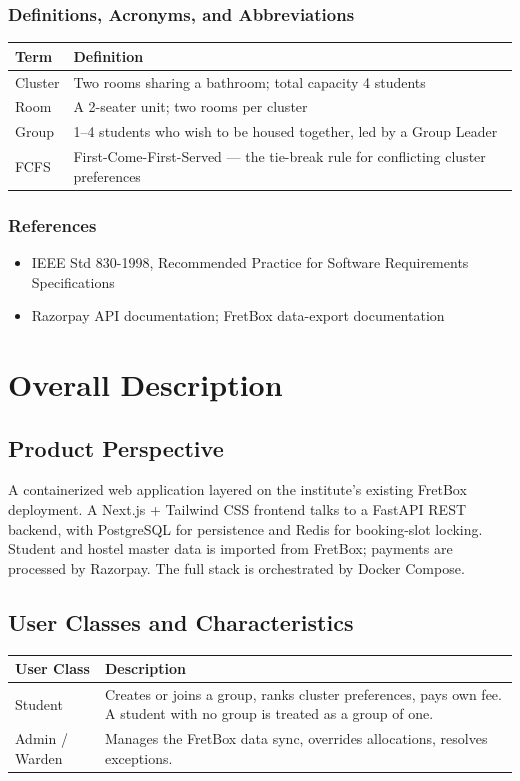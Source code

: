 \documentclass[11pt]{report}
\begin{document}
\subsection*{Definitions, Acronyms, and Abbreviations}
\begin{longtable}{p{3.2cm}p{10cm}}
\toprule
\textbf{Term} & \textbf{Definition} \\
\midrule
Cluster & Two rooms sharing a bathroom; total capacity 4 students \\
Room & A 2-seater unit; two rooms per cluster \\
Group & 1--4 students who wish to be housed together, led by a Group Leader \\
FCFS & First-Come-First-Served --- the tie-break rule for conflicting cluster preferences \\
\bottomrule
\end{longtable}

\subsection*{References}
\begin{itemize}[leftmargin=1.2cm]
    \item IEEE Std 830-1998, Recommended Practice for Software Requirements Specifications
    \item Razorpay API documentation; FretBox data-export documentation
\end{itemize}

\chapter{Overall Description}

\section{Product Perspective}
A containerized web application layered on the institute's existing FretBox deployment. A Next.js +
Tailwind CSS frontend talks to a FastAPI REST backend, with PostgreSQL for persistence and Redis for
booking-slot locking. Student and hostel master data is imported from FretBox; payments are processed
by Razorpay. The full stack is orchestrated by Docker Compose.

\section{User Classes and Characteristics}
\begin{longtable}{p{3cm}p{10.5cm}}
\toprule
\textbf{User Class} & \textbf{Description} \\
\midrule
Student & Creates or joins a group, ranks cluster preferences, pays own fee. A student with no group is treated as a group of one. \\
Admin / Warden & Manages the FretBox data sync, overrides allocations, resolves exceptions. \\
\bottomrule
\end{longtable}
\end{document}
